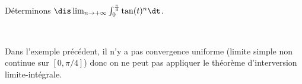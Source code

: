 \documentclass[a4paper,10pt]{report}
\begin{document}
\begin{ex} Déterminons $\dis \lim_{n \rightarrow + \infty} \int_{0}^{\frac{\pi}{4}} \tan(t)^n \dt$.

\medskip


\vspace{10cm}
%
\end{ex}

\newpage

$\phantom{test}$

\vspace{4cm}

\begin{rem} Dans l'exemple précédent, il n'y a pas convergence uniforme (limite simple non continue sur $[0, \pi/4]$) donc on ne peut pas appliquer le théorème d'interversion limite-intégrale.
\end{rem}

%
\end{document}
